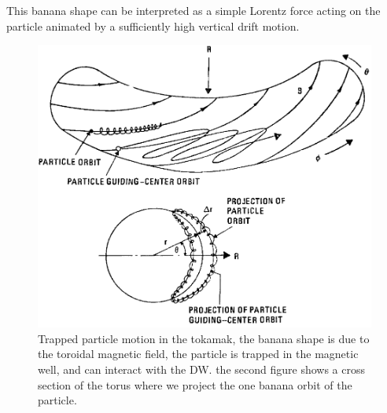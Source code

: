 \documentclass[11pt,a4paper]{report}
\begin{document}
\begin{multicols}{2}
    This banana shape can be interpreted as a simple Lorentz force acting on the particle animated by a sufficiently high vertical drift motion.
    \begin{figure}[H]
        \centering
        \includegraphics[width=1\linewidth]{./figures/banana.png}
        \caption{Trapped particle motion in the tokamak, the banana shape is due to the toroidal magnetic field, the particle is trapped in the magnetic well, and can interact with the DW. the second figure shows a cross section of the torus where we project the one banana orbit of the particle.}
        \label{}
    \end{figure}


\end{multicols}
\end{document}
